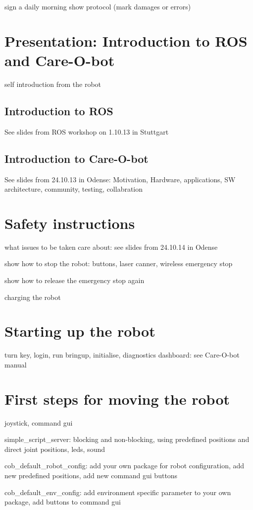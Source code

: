 \documentclass[12pt,twoside]{report}
\begin{document}
sign a daily morning show protocol (mark damages or errors)

\section{Presentation: Introduction to ROS and Care-O-bot}
self introduction from the robot

\subsection{Introduction to ROS}
See slides from ROS workshop on 1.10.13 in Stuttgart
\subsection{Introduction to Care-O-bot}
See slides from 24.10.13 in Odense: Motivation, Hardware, applications, SW architecture, community, testing, collabration

\section{Safety instructions}
what issues to be taken care about: see slides from 24.10.14 in Odense

show how to stop the robot: buttons, laser canner, wireless emergency stop

show how to release the emergency stop again

charging the robot

\section{Starting up the robot}
turn key, login, run bringup, initialise, diagnostics dashboard: see Care-O-bot manual

\section{First steps for moving the robot}
joystick, command gui

simple\_script\_server: blocking and non-blocking, using predefined positions and direct joint positions, leds, sound

cob\_default\_robot\_config: add your own package for robot configuration, add new predefined positions, add new command gui buttons

cob\_default\_env\_config: add environment specific parameter to your own package, add buttons to command gui
\end{document}
